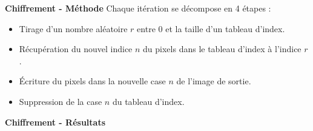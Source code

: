 \documentclass{beamer}
\begin{document}
\begin{frame}[t]
\begin{columns}[t]
\begin{column}{.49\linewidth}
\begin{block}{\centering \textbf{Chiffrement - Méthode}}
                    Chaque itération se décompose en 4 étapes :
                    \begin{itemize}[label=-]
                        \item Tirage d'un nombre aléatoire $r$ entre 0 et la taille d'un tableau d'index.
                        \item Récupération du nouvel indice $n$ du pixels dans le tableau d'index à l'indice $r$.
                        \item Écriture du pixels dans la nouvelle case $n$ de l'image de sortie.
                        \item Suppression de la case $n$ du tableau d'index.
                    \end{itemize}

                    \vspace{.5cm}
                \end{block}

                \vspace{.5cm}


                \begin{block}{\centering \textbf{Chiffrement - Résultats}}
                    \vspace{.5cm}


\end{block}
\end{column}
\end{columns}
\end{frame}
\end{document}
